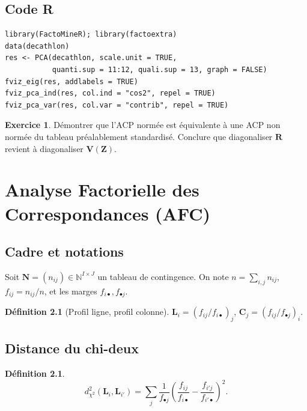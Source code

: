 \documentclass[11pt, a4paper, openany]{book}
\theoremstyle{plain}
\theoremstyle{definition}
\newtheorem{definition}[theorem]{Définition}
\newtheorem{exercice}{Exercice}[chapter]
\theoremstyle{remark}
\newcommand{\N}{\mathbb{N}}
\newcommand{\1}{\mathds{1}}
\newcommand{\V}{\mathbf{V}}
\newcommand{\Z}{\mathbf{Z}}
\begin{document}
\section{Code R}
\begin{lstlisting}
library(FactoMineR); library(factoextra)
data(decathlon)
res <- PCA(decathlon, scale.unit = TRUE,
           quanti.sup = 11:12, quali.sup = 13, graph = FALSE)
fviz_eig(res, addlabels = TRUE)
fviz_pca_ind(res, col.ind = "cos2", repel = TRUE)
fviz_pca_var(res, col.var = "contrib", repel = TRUE)
\end{lstlisting}

\begin{exercice}
Démontrer que l'ACP normée est équivalente à une ACP non normée du tableau
préalablement standardisé. Conclure que diagonaliser $\mathbf{R}$ revient
à diagonaliser $\V(\Z)$.
\end{exercice}

\chapter{Analyse Factorielle des Correspondances (AFC)}

\section{Cadre et notations}

Soit $\mathbf{N} = (n_{ij}) \in \N^{I \times J}$ un tableau de contingence.
On note $n = \sum_{i,j} n_{ij}$, $f_{ij} = n_{ij}/n$, et les marges
$f_{i\bullet}, f_{\bullet j}$.

\begin{definition}[Profil ligne, profil colonne]
$\mathbf{L}_i = (f_{ij}/f_{i\bullet})_j$, $\mathbf{C}_j = (f_{ij}/f_{\bullet j})_i$.
\end{definition}

\section{Distance du chi-deux}

\begin{definition}
\[
d_{\chi^2}^2(\mathbf{L}_i, \mathbf{L}_{i'}) = \sum_j \frac{1}{f_{\bullet j}}
\left(\frac{f_{ij}}{f_{i\bullet}} - \frac{f_{i'j}}{f_{i'\bullet}}\right)^2.
\]
\end{definition}
\end{document}

